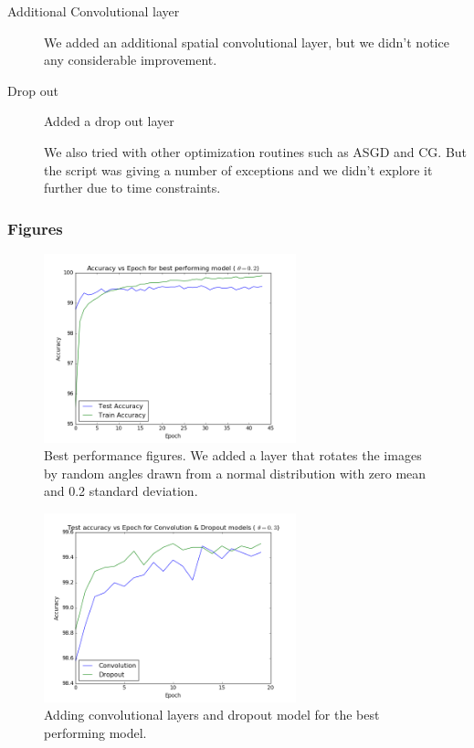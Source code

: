 \documentclass{article}
\begin{document}
\begin{description}
\item[Additional Convolutional layer] We added an additional spatial convolutional layer, but we didn't notice any considerable improvement.

\item[Drop out] Added a drop out layer    

    We also tried with other optimization routines such as ASGD and CG.  But the script was giving a number of exceptions and we didn't explore it further due to time constraints.
\end{description}
\subsubsection{Figures}
\begin{figure}[ht!]
  \centering
  \includegraphics[width=0.65\textwidth]{bestPerformance}
  \caption{Best performance figures. We added a layer that rotates the images by random angles drawn from a normal distribution with zero mean and 0.2 standard deviation. \label{fig:best_performance}}
\end{figure}
\begin{figure}[ht!]
  \centering
  \includegraphics[width=0.65\textwidth]{convolution_dropout}
  \caption{Adding convolutional layers and dropout model for the best performing model. \label{fig:convolution_dropout}}
\end{figure}
\end{document}
